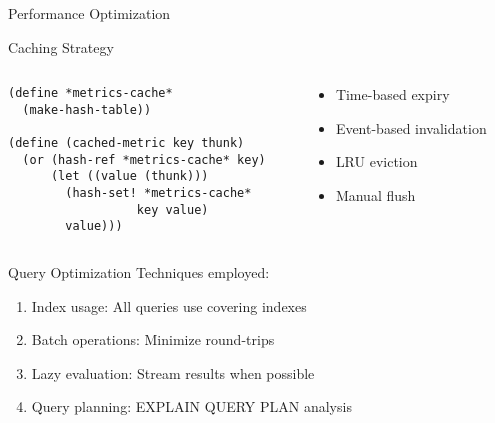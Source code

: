 \documentclass[presentation,aspectratio=169]{beamer}
\begin{document}
\begin{frame}[label={sec:org0afb0bd},fragile]{Performance Optimization}
 \begin{block}{Caching Strategy}
\begin{columns}
\begin{column}{0.5\columnwidth}
\begin{verbatim}
(define *metrics-cache*
  (make-hash-table))

(define (cached-metric key thunk)
  (or (hash-ref *metrics-cache* key)
      (let ((value (thunk)))
        (hash-set! *metrics-cache*
                  key value)
        value)))
\end{verbatim}
\end{column}
\begin{column}{0.5\columnwidth}
\begin{itemize}
\item Time-based expiry
\item Event-based invalidation
\item LRU eviction
\item Manual flush
\end{itemize}
\end{column}
\end{columns}
\end{block}
\begin{block}{Query Optimization}
Techniques employed:
\begin{enumerate}
\item \alert{\alert{Index usage}}: All queries use covering indexes
\item \alert{\alert{Batch operations}}: Minimize round-trips
\item \alert{\alert{Lazy evaluation}}: Stream results when possible
\item \alert{\alert{Query planning}}: EXPLAIN QUERY PLAN analysis
\end{enumerate}


\end{block}
\end{frame}
\end{document}
